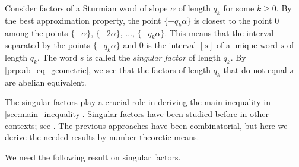 \documentclass[a4paper,fleqn]{article}
\begin{document}
  \begin{remark}\label{rem:singular}
    Consider factors of a Sturmian word of slope $\alpha$ of length $q_k$ for some $k \geq 0$. By the best
    approximation property, the point $\{-q_k\alpha\}$ is closest to the point $0$ among the points $\{-\alpha\}$,
    $\{-2\alpha\}$, $\ldots$, $\{-q_k \alpha\}$. This means that the interval separated by the points $\{-q_k\alpha\}$
    and $0$ is the interval $[s]$ of a unique word $s$ of length $q_k$. The word $s$ is called the \emph{singular
    factor} of length $q_k$. By \autoref{prp:ab_eq_geometric}, we see that the factors of length $q_k$ that do not
    equal $s$ are abelian equivalent.
    
    The singular factors play a crucial role in deriving the main inequality in \autoref{sec:main_inequality}. Singular
    factors have been studied before in other contexts; see
    \cite{1999:lyndon_words_and_singular_factors_of_sturmian,2003:some_properties_of_the_factors_of_sturmian_sequences}.
    The previous approaches have been combinatorial, but here we derive the needed results by number-theoretic means.
  \end{remark}

  We need the following result on singular factors.
\end{document}

